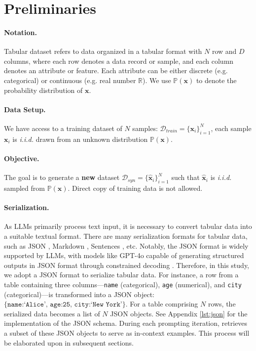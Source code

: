 \section{Preliminaries}
\label{preliminaries}
\paragraph{Notation.}  Tabular dataset refers to data organized in a tabular format with $N$ row and $D$ columns, where each row denotes a data record or sample, and each column denotes an attribute or feature. Each attribute can be either discrete (e.g. categorical) or continuous (e.g. real number $\mathbb{R}$). We use $\mathbb{P}(\boldsymbol{x})$ to denote the probability distribution of $\boldsymbol{x}$.

\paragraph{Data Setup.} We have access to a training dataset of $N$ samples: $\mathcal{D}_{train} = \{\boldsymbol{x}_i\}_{i=1}^N$, each sample $\boldsymbol{x}_i$ is \textit{i.i.d.} drawn from an unknown distribution $\mathbb{P}(\boldsymbol{x})$. 

\paragraph{Objective.} The goal is to generate a \textbf{new} dataset $\mathcal{D}_{syn}=\{\hat{\boldsymbol{x}}_{i}\}_{i=1}^N$ such that $\hat{\boldsymbol{x}}_i$ is \textit{i.i.d.} sampled from $\mathbb{P}(\boldsymbol{x})$. Direct copy of training data is not allowed.

\paragraph{Serialization.}
As LLMs primarily process text input, it is necessary to convert tabular data into a suitable textual format. There are many serialization formats for tabular data, such as JSON \citep{singha2023tabular}, Markdown \citep{sui2024table}, Sentences \citep{great}, etc. Notably, the JSON format is widely supported by LLMs, with models like GPT-4o capable of generating structured outputs in JSON format through constrained decoding \citep{liu2024we}.
Therefore, in this study, we adopt a JSON format to serialize tabular data. For instance, a row from a table containing three columns—\texttt{name} (categorical), \texttt{age} (numerical), and \texttt{city} (categorical)—is transformed into a JSON object: $\{\texttt{{name:`Alice', age:25, city:`New York'}}\}$. For a table comprising $N$ rows, the serialized data becomes a list of $N$ JSON objects. See Appendix \ref{lst:json} for the implementation of the JSON schema.
During each prompting iteration, \modelname retrieves a subset of these JSON objects to serve as in-context examples. This process will be elaborated upon in subsequent sections. 

